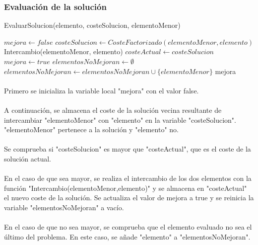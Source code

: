 \documentclass{article}
\begin{document}
	\subsubsection{Evaluación de la solución}
	\begin{algorithm}[H]
		\caption{EvaluarSolucion(elemento, costeSolucion, elementoMenor)}
		\begin{algorithmic}
			\STATE $mejora \leftarrow false$
			\STATE $costeSolucion \leftarrow CosteFactorizado(elementoMenor, elemento)$
			\STATE Intercambio(elementoMenor, elemento)
			\STATE $costeActual \leftarrow costeSolucion$
			\STATE $mejora \leftarrow true$
			\STATE $elementosNoMejoran \leftarrow \emptyset$
			\STATE $elementosNoMejoran \leftarrow elementosNoMejoran \cup \{elementoMenor\}$
			\ENDIF
			\RETURN mejora
			\	
		\end{algorithmic}
	\end{algorithm}

	\paragraph{}Primero se inicializa la variable local "mejora" con el valor false.
	
	\paragraph{}A continuación, se almacena el coste de la solución vecina resultante de intercambiar "elementoMenor" con "elemento" en la variable "costeSolucion". "elementoMenor" pertenece a la solución y "elemento" no.
	
	\paragraph{}Se comprueba si "costeSolucion" es mayor que "costeActual", que es el coste de la solución actual.
	
	\paragraph{}En el caso de que sea mayor, se realiza el intercambio de los dos elementos con la función "Intercambio(elementoMenor,elemento)" y se almacena en "costeActual" el nuevo coste de la solución. Se actualiza el valor de mejora a true y se reinicia la variable "elementosNoMejoran" a vacío.
	
	\paragraph{}En el caso de que no sea mayor, se comprueba que el elemento evaluado no sea el último del problema. En este caso, se añade "elemento" a "elementosNoMejoran".
	
\end{document}
